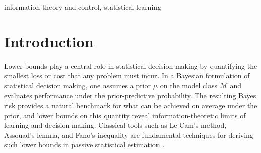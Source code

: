 \documentclass[conference]{IEEEtran}
\begin{document}







\maketitle


{\begin{abstract}
Recent work established a generalized-Fano framework for lower bounding prior-predictive (Bayesian) CVaR in interactive statistical decision making. In this paper, we show how to instantiate that framework in concrete interactive problems and derive explicit Bayesian CVaR lower bounds from its abstract corollaries. Our approach compares a hard model with a reference model using squared Hellinger distance, and combines a lower bound on a reference hinge term with a bound on the distinguishability of the two models. We apply this approach to canonical examples, including Gaussian bandits, and obtain explicit bounds that make the dependence on key problem parameters transparent. These results show how the generalized-Fano Bayesian CVaR framework can be used as a practical lower-bound tool for interactive learning and risk-sensitive decision making.
\end{abstract}
}


\begin{IEEEkeywords}
information theory and control, statistical learning
\end{IEEEkeywords}

\section{Introduction}
Lower bounds play a central role in statistical decision making by quantifying the smallest loss or cost that any problem must incur. In a Bayesian formulation of statistical decision making, one assumes a prior \(\mu\) on the model class \(\mathcal{M}\) and evaluates performance under the prior-predictive probability. The resulting Bayes risk provides a natural benchmark for what can be achieved on average under the prior, and lower bounds on this quantity reveal information-theoretic limits of learning and decision making. Classical tools such as Le Cam's method, Assouad's lemma, and Fano's inequality are fundamental techniques for deriving such lower bounds in passive statistical estimation \cite{tsybakov2009introduction}.
\end{document}
